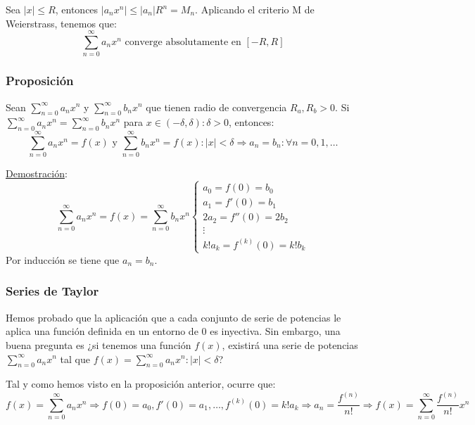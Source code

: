 \documentclass[10pt,a4paper,openright]{book}
\begin{document}
Sea $|x| \leq R$, entonces $|a_n x^n| \leq |a_n| R^n = M_n$. Aplicando el criterio M de Weierstrass, tenemos que:
$$\sum_{n=0}^{\infty} a_n x^n \mbox{ converge absolutamente en } [-R,R]$$

\subsubsection*{Proposición}
Sean $\sum_{n=0}^{\infty} a_n x^n$ y $\sum_{n=0}^{\infty} b_n x^n$ que tienen radio de convergencia $R_a, R_b >0$. Si $\sum_{n=0}^{\infty} a_n x^n = \sum_{n=0}^{\infty} b_n x^n$ para $x \in (-\delta, \delta) : \delta > 0$, entonces:
$$\sum_{n=0}^{\infty} a_n x^n = f(x)\mbox{ y }\sum_{n=0}^{\infty} b_n x^n = f(x) : |x| < \delta \Rightarrow a_n = b_n : \forall n = 0, 1, \ldots$$

\underline{Demostración}:
$$\sum_{n=0}^{\infty} a_n x^n = f(x) = \sum_{n=0}^{\infty} b_n x^n \begin{cases} a_0 = f(0) = b_0 \\ a_1 = f'(0) = b_1 \\ 2 a_2 = f''(0) = 2 b_2 \\ \vdots \\ k! a_k = f^{(k)}(0) = k! b_k \end{cases}$$
Por inducción se tiene que $a_n = b_n$.

\subsubsection*{Series de Taylor}
Hemos probado que la aplicación que a cada conjunto de serie de potencias le aplica una función definida en un entorno de 0 es inyectiva. Sin embargo, una buena pregunta es ¿si tenemos una función $f(x)$, existirá una serie de potencias $\sum_{n= 0}^{\infty} a_n x^n $ tal que $f(x) = \sum_{n= 0}^{\infty} a_n x^n : |x| < \delta$?

Tal y como hemos visto en la proposición anterior, ocurre que:
$$f(x) = \sum_{n= 0}^{\infty} a_n x^n \Rightarrow f(0) = a_0, f'(0) = a_1, \ldots, f^{(k)}(0) = k! a_k \Rightarrow a_n = \frac{f^{(n)}}{n!} \Rightarrow f(x) = \sum_{n=0}^{\infty} \frac{f^{(n)}}{n!} x^n$$
\end{document}
